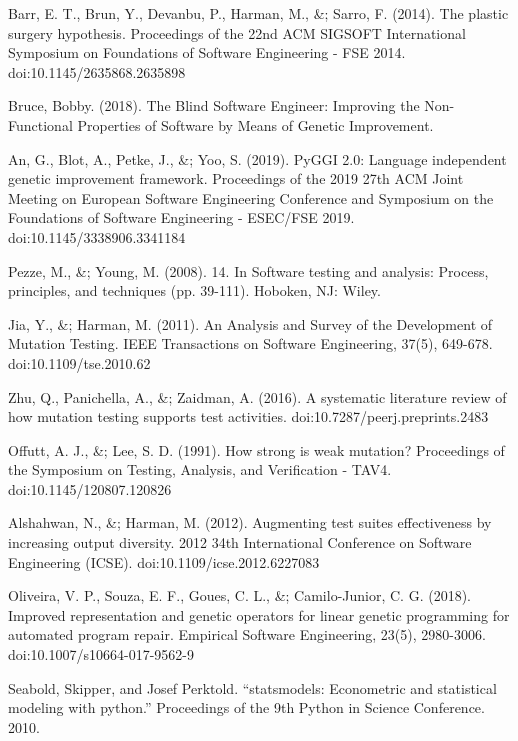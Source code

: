 \documentclass[titlepage]{article}
\begin{document}
\begin{thebibliography}{99}
Barr, E. T., Brun, Y., Devanbu, P., Harman, M., \&; Sarro, F. (2014). The plastic surgery hypothesis. Proceedings of the 22nd ACM SIGSOFT International Symposium on Foundations of Software Engineering - FSE 2014. doi:10.1145/2635868.2635898

Bruce, Bobby. (2018). The Blind Software Engineer: Improving the Non-Functional Properties of Software by Means of Genetic Improvement. 

An, G., Blot, A., Petke, J., \&; Yoo, S. (2019). PyGGI 2.0: Language independent genetic improvement framework. Proceedings of the 2019 27th ACM Joint Meeting on European Software Engineering Conference and Symposium on the Foundations of Software Engineering - ESEC/FSE 2019. doi:10.1145/3338906.3341184

Pezze, M., \&; Young, M. (2008). 14. In Software testing and analysis: Process, principles, and techniques (pp. 39-111). Hoboken, NJ: Wiley.

Jia, Y., \&; Harman, M. (2011). An Analysis and Survey of the Development of Mutation Testing. IEEE Transactions on Software Engineering, 37(5), 649-678. doi:10.1109/tse.2010.62

Zhu, Q., Panichella, A., \&; Zaidman, A. (2016). A systematic literature review of how mutation testing supports test activities. doi:10.7287/peerj.preprints.2483

Offutt, A. J., \&; Lee, S. D. (1991). How strong is weak mutation? Proceedings of the Symposium on Testing, Analysis, and Verification - TAV4. doi:10.1145/120807.120826

Alshahwan, N., \&; Harman, M. (2012). Augmenting test suites effectiveness by increasing output diversity. 2012 34th International Conference on Software Engineering (ICSE). doi:10.1109/icse.2012.6227083

Oliveira, V. P., Souza, E. F., Goues, C. L., \&; Camilo-Junior, C. G. (2018). Improved representation and genetic operators for linear genetic programming for automated program repair. Empirical Software Engineering, 23(5), 2980-3006. doi:10.1007/s10664-017-9562-9

Seabold, Skipper, and Josef Perktold. “statsmodels: Econometric and statistical modeling with python.” Proceedings of the 9th Python in Science Conference. 2010.


\end{thebibliography}
\end{document}
